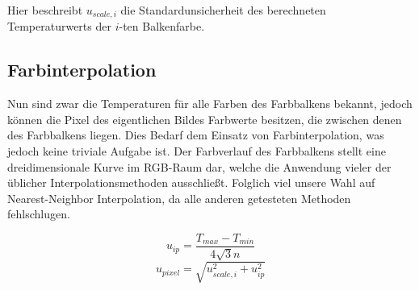\documentclass[10pt,a4paper,german]{article}
\begin{document}
Hier beschreibt $u_{scale,i}$ die Standardunsicherheit des berechneten Temperaturwerts der $i$-ten Balkenfarbe.

\subsection{Farbinterpolation}
Nun sind zwar die Temperaturen für alle Farben des Farbbalkens bekannt, jedoch können die Pixel des eigentlichen Bildes Farbwerte besitzen, die zwischen denen des Farbbalkens liegen.
Dies Bedarf dem Einsatz von Farbinterpolation, was jedoch keine triviale Aufgabe ist.
Der Farbverlauf des Farbbalkens stellt eine dreidimensionale Kurve im RGB-Raum dar, welche die Anwendung vieler der üblicher Interpolationsmethoden ausschließt.
Folglich viel unsere Wahl auf Nearest-Neighbor Interpolation, da alle anderen getesteten Methoden fehlschlugen.

\begin{equation}
    u_{ip} = \frac{T_{max} - T_{min}}{4\sqrt{3}n}
\end{equation}
\begin{equation}
    u_{pixel} = \sqrt{u_{scale,i}^2 + u_{ip}^2}
\end{equation}
\end{document}
